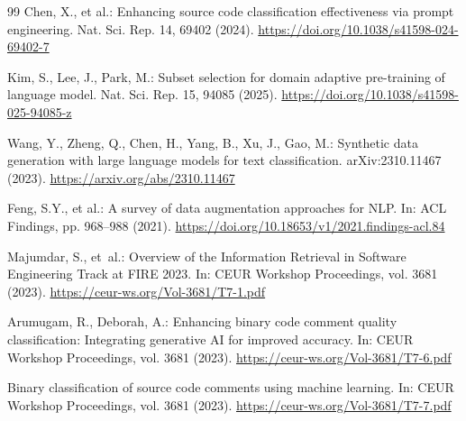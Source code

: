 \documentclass[runningheads]{ceurart}
\begin{document}
\begin{thebibliography}{99}
Chen, X., et al.: 
Enhancing source code classification effectiveness via prompt engineering. 
Nat. Sci. Rep. 14, 69402 (2024). 
\url{https://doi.org/10.1038/s41598-024-69402-7}

Kim, S., Lee, J., Park, M.: 
Subset selection for domain adaptive pre-training of language model. 
Nat. Sci. Rep. 15, 94085 (2025). 
\url{https://doi.org/10.1038/s41598-025-94085-z}

Wang, Y., Zheng, Q., Chen, H., Yang, B., Xu, J., Gao, M.: 
Synthetic data generation with large language models for text classification. 
arXiv:2310.11467 (2023). 
\url{https://arxiv.org/abs/2310.11467}

Feng, S.Y., et al.: 
A survey of data augmentation approaches for NLP. 
In: ACL Findings, pp. 968--988 (2021). 
\url{https://doi.org/10.18653/v1/2021.findings-acl.84}

Majumdar, S., et~al.: 
Overview of the Information Retrieval in Software Engineering Track at FIRE 2023. 
In: CEUR Workshop Proceedings, vol. 3681 (2023). 
\url{https://ceur-ws.org/Vol-3681/T7-1.pdf}

Arumugam, R., Deborah, A.: 
Enhancing binary code comment quality classification: Integrating generative AI for improved accuracy. 
In: CEUR Workshop Proceedings, vol. 3681 (2023). 
\url{https://ceur-ws.org/Vol-3681/T7-6.pdf}

Binary classification of source code comments using machine learning. 
In: CEUR Workshop Proceedings, vol. 3681 (2023). 
\url{https://ceur-ws.org/Vol-3681/T7-7.pdf}

\end{thebibliography}
\end{document}
